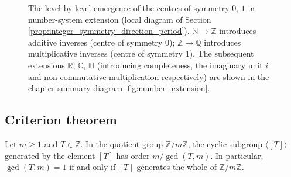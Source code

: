 \begin{figure}[htbp]
    \centering
    \caption{The level-by-level emergence of the centres of symmetry $0$, $1$ in number-system extension (local diagram of Section \ref{prop:integer_symmetry_direction_period}). $\mathbb{N}\to\mathbb{Z}$ introduces additive inverses (centre of symmetry $0$); $\mathbb{Z}\to\mathbb{Q}$ introduces multiplicative inverses (centre of symmetry $1$). The subsequent extensions $\mathbb{R}$, $\mathbb{C}$, $\mathbb{H}$ (introducing completeness, the imaginary unit $i$ and non-commutative multiplication respectively) are shown in the chapter summary diagram \ref{fig:number_extension}.}
    \label{fig:symmetry_centre_emergence}
\end{figure}
\subsection{\texorpdfstring{Criterion theorem}{Criterion theorem}}

\begin{lemma}\label{lem:order_cyclic_subgroup_ch2}
Let $m \ge 1$ and $T \in \mathbb{Z}$. In the quotient group $\mathbb{Z}/m\mathbb{Z}$, the cyclic subgroup $\langle [T] \rangle$ generated by the element $[T]$ has order $m/\gcd(T,m)$. In particular, $\gcd(T,m) = 1$ if and only if $[T]$ generates the whole of $\mathbb{Z}/m\mathbb{Z}$.
\end{lemma}

